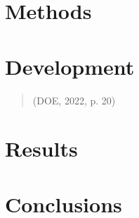 \documentclass[12pt]{article}
\begin{document}
{\begin{spacing}{1.5}
			\blindtext[1]\par
			
			\blindtext[1]
		
	\section{Methods}
			\blindtext[1]
	
	\section{Development}
			
			\blindtext[1]
			
			\begin{quotation}
				
				\begin{singlespace}
					\noindent
					\blindtext[1]
					(DOE, 2022, p. 20)
				\end{singlespace}
			
			\end{quotation}
	
	\section{Results}
		
			\blindtext[1]\par
			
			\blindtext[1]\par
			
			\blindtext[1]
	
	\section{Conclusions}

			\blindtext[1]\par
			
			\blindtext[1]\par
			
			\blindtext[1]
	\end{spacing}
}%
\end{document}
